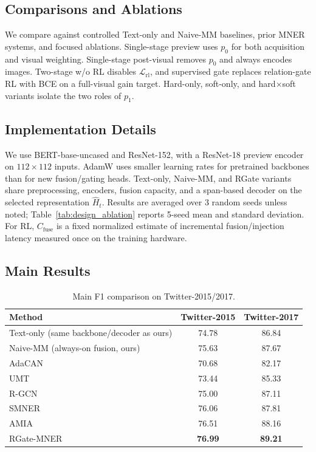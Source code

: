 \documentclass{llncs}
\newcommand{\Lrl}{\mathcal{L}_{\mathrm{rl}}}
\begin{document}
\subsection{Comparisons and Ablations}
We compare against controlled Text-only and Naive-MM baselines, prior MNER systems, and focused ablations. Single-stage preview uses $p_0$ for both acquisition and visual weighting. Single-stage post-visual removes $p_0$ and always encodes images. Two-stage w/o RL disables $\Lrl$, and supervised gate replaces relation-gate RL with BCE on a full-visual gain target. Hard-only, soft-only, and hard$\times$soft variants isolate the two roles of $p_1$.

\subsection{Implementation Details}
We use BERT-base-uncased and ResNet-152, with a ResNet-18 preview encoder on $112\times112$ inputs. AdamW uses smaller learning rates for pretrained backbones than for new fusion/gating heads. Text-only, Naive-MM, and RGate variants share preprocessing, encoders, fusion capacity, and a span-based decoder on the selected representation $\hat H_t$. Results are averaged over 3 random seeds unless noted; Table~\ref{tab:design_ablation} reports 5-seed mean and standard deviation. For RL, $C_{\mathrm{fuse}}$ is a fixed normalized estimate of incremental fusion/injection latency measured once on the training hardware.

\subsection{Main Results}
\FloatBarrier
\begin{table}[!htbp]
\caption{Main F1 comparison on Twitter-2015/2017.}
\centering
\footnotesize
\setlength{\tabcolsep}{4pt}
\renewcommand{\arraystretch}{0.95}
\begin{tabular}{lcc}
\toprule
Method & Twitter-2015 & Twitter-2017 \\
\midrule
Text-only (same backbone/decoder as ours) & 74.78 & 86.84 \\
Naive-MM (always-on fusion, ours) & 75.63 & 87.67 \\
AdaCAN~\cite{zhang_adaptive_2018} & 70.68 & 82.17 \\
UMT~\cite{yu_improving_2020} & 73.44 & 85.33 \\
R-GCN~\cite{zhao_learning_2022} & 75.00 & 87.11 \\
SMNER~\cite{xu_effective_2024} & 76.06 & 87.81 \\
AMIA~\cite{xu_enhancing_2025} & 76.51 & 88.16 \\
\midrule
RGate-MNER & \textbf{76.99} & \textbf{89.21} \\
\bottomrule
\end{tabular}
\label{tab:main_compact}
\end{table}
\FloatBarrier
\end{document}
